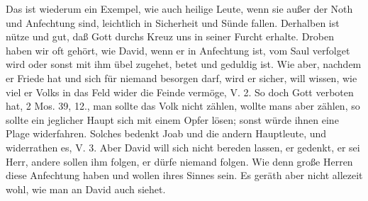 Das ist wiederum ein Exempel, wie auch heilige Leute, wenn sie außer der Noth und Anfechtung sind, leichtlich in Sicherheit und Sünde fallen. Derhalben ist nütze und gut, daß Gott durchs Kreuz uns in seiner Furcht erhalte. Droben haben wir oft gehört, wie David, wenn er in Anfechtung ist, vom Saul verfolget wird oder sonst mit ihm übel zugehet, betet und geduldig ist. Wie aber, nachdem er Friede hat und sich für niemand besorgen darf, wird er sicher, will wissen, wie viel er Volks in das Feld wider die Feinde vermöge, V. 2. So doch Gott verboten hat, 2 Mos. 39, 12., man sollte das Volk nicht zählen, wollte mans aber zählen, so sollte ein jeglicher Haupt sich mit einem Opfer lösen; sonst würde ihnen eine Plage widerfahren. Solches bedenkt Joab und die andern Hauptleute, und widerrathen es, V. 3. Aber David will sich nicht bereden lassen, er gedenkt, er sei Herr, andere sollen ihm folgen, er dürfe niemand folgen. Wie denn große Herren diese Anfechtung haben und wollen ihres Sinnes sein. Es geräth aber nicht allezeit wohl, wie man an David auch siehet.
